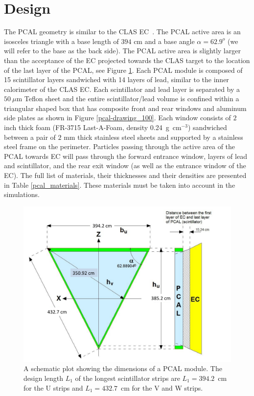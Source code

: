 \section{Design}

The PCAL geometry is similar to the CLAS EC~\cite{clas6nim}.  The PCAL active area is an isosceles triangle with a base length of $394$ cm and a base angle $\alpha=62.9^o$ (we will refer to the base as the back side).  The PCAL active area is slightly larger than the acceptance of the EC projected towards the CLAS target to the location of the last layer of the PCAL, see Figure \ref{pcal-triangle}. Each PCAL module is composed of 15 scintillator layers sandwiched with 14 layers of lead, similar to the inner calorimeter of the CLAS EC.  Each scintillator and lead layer is separated by a $50~\mu$m Teflon sheet and the entire scintillator/lead volume is confined within a triangular shaped box that has composite front and rear windows and aluminum side plates as shown in Figure \ref{pcal-drawing_100}. Each window consists of $2$ inch thick foam (FR-3715 Last-A-Foam, density 0.24~g~cm$^{-3}$) sandwiched between a pair of $2$ mm thick stainless steel sheets and supported by a stainless steel frame on the perimeter. Particles passing through the active area of the PCAL towards EC will pass through the forward entrance window, layers of lead and scintillator, and the rear exit window (as well as the entrance window of the EC). The full list of materials, their thicknesses and their densities are presented in Table \ref{pcal_materials}. These materials must be taken into account in the simulations. 
\begin{figure}
\centering
\includegraphics[scale=0.4]{images/pcal_ec_projection.pdf}
\caption[A schematic plot of PCAL]{A schematic plot showing the dimensions of a PCAL module. The design length $L_1$ of the longest scintillator strips are $L_1=394.2$~cm for the U strips and $L_1=432.7$~cm for the V and W strips. }
\label{pcal-triangle}
\end{figure}
